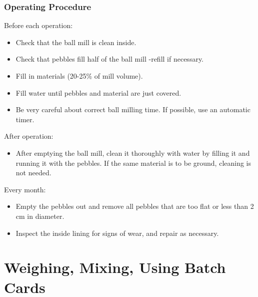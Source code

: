 \subsubsection{Operating Procedure}
Before each operation:
\begin{itemize}
\item Check that the ball mill is clean inside.
\item Check that pebbles fill half of the ball mill -refill if necessary.
\item Fill in materials (20-25\% of mill volume).
\item Fill water until pebbles and material are just covered.
\item Be very careful about correct ball milling time. If possible, use an 
automatic timer.
\end{itemize}
After operation:
\begin{itemize}
\item After emptying the ball mill, clean it thoroughly with water by filling 
it and running it with the pebbles. If the same material is to be ground, 
cleaning is not needed.
\end{itemize}
Every month:
\begin{itemize}
\item Empty the pebbles out and remove all pebbles that are too flat or less 
than 2 cm in diameter.
\item Inspect the inside lining for signs of wear, and repair as necessary.
\end{itemize}
\section{Weighing, Mixing, Using Batch Cards}
